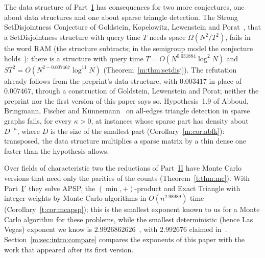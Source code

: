 \documentclass[11pt]{article}
\theoremstyle{definition}
\theoremstyle{remark}
\newcommand{\SetDisjEtaPruned}{0.007467}%
\newcommand{\APSPdetNow}{2.9926862626}%
\newcommand{\APSPmcOurs}{2.98989}%
\newcommand{\APSPdetEZClaim}{2.992676}%
\newcommand{\SetDisjTauPruned}{0.031884}%
\newcommand{\SetDisjEtaPreprint}{0.003417}%
\begin{document}
The data structure of Part~\hyperref[m:partI]{I} has consequences for two more conjectures, one about data structures and one about sparse triangle detection. The Strong SetDisjointness Conjecture of Goldstein, Kopelowitz, Lewenstein and Porat~\cite{GKLP17,GLP19}, that a SetDisjointness structure with query time $T$ needs space $\tilde\Omega(N^2/T^2)$, fails in the word RAM (the structure subtracts; in the semigroup model the conjecture holds~\cite{DMRU95}): there is a structure with query time $T=O(N^{\SetDisjTauPruned}\log^2N)$ and $ST^2=O(N^{2-\SetDisjEtaPruned}\log^{11}N)$ (Theorem~\ref{m:thm:setdisj}). The refutation already follows from the preprint's data structure, with $\SetDisjEtaPreprint$ in place of $\SetDisjEtaPruned$, through a construction of Goldstein, Lewenstein and Porat; neither the preprint nor the first version of this paper says so. Hypothesis~1.9 of Abboud, Bringmann, Fischer and K\"unnemann~\cite{ABFK24} on all-edges triangle detection in sparse graphs fails, for every $\kappa>0$, at instances whose sparse part has density about $D^{-\kappa}$, where $D$ is the size of the smallest part (Corollary~\ref{m:cor:abfk}): transposed, the data structure multiplies a sparse matrix by a thin dense one faster than the hypothesis allows.

Over fields of characteristic two the reductions of Part~\hyperref[m:partII]{II} have Monte Carlo versions that need only the parities of the counts (Theorem~\ref{t:thm:mc}). With Part~\hyperref[t:partIp]{I$'$} they solve APSP, the $(\min,+)$-product and Exact Triangle with integer weights by Monte Carlo algorithms in $O(n^{\APSPmcOurs})$ time (Corollary~\ref{t:cor:mcapsp}); this is the smallest exponent known to us for a Monte Carlo algorithm for these problems, while the smallest deterministic (hence Las Vegas) exponent we know is $\APSPdetNow$~\cite{Shr26}, with $\APSPdetEZClaim$ claimed in~\cite[v2, footnote~1]{EZ26}. Section~\ref{m:sec:intro:compare} compares the exponents of this paper with the work that appeared after its first version.
\end{document}
